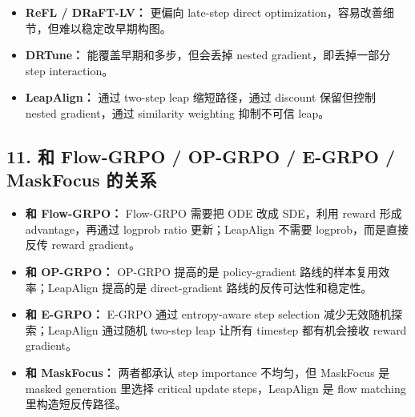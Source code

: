 \begin{itemize}[leftmargin=1.5em]
  \item \textbf{ReFL / DRaFT-LV：} 更偏向 late-step direct optimization，容易改善细节，但难以稳定改早期构图。
  \item \textbf{DRTune：} 能覆盖早期和多步，但会丢掉 nested gradient，即丢掉一部分 step interaction。
  \item \textbf{LeapAlign：} 通过 two-step leap 缩短路径，通过 discount 保留但控制 nested gradient，通过 similarity weighting 抑制不可信 leap。
\end{itemize}

\subsection{11. 和 Flow-GRPO / OP-GRPO / E-GRPO / MaskFocus 的关系}

\begin{center}
\end{center}

\begin{itemize}[leftmargin=1.5em]
  \item \textbf{和 Flow-GRPO：} Flow-GRPO 需要把 ODE 改成 SDE，利用 reward 形成 advantage，再通过 logprob ratio 更新；LeapAlign 不需要 logprob，而是直接反传 reward gradient。
  \item \textbf{和 OP-GRPO：} OP-GRPO 提高的是 policy-gradient 路线的样本复用效率；LeapAlign 提高的是 direct-gradient 路线的反传可达性和稳定性。
  \item \textbf{和 E-GRPO：} E-GRPO 通过 entropy-aware step selection 减少无效随机探索；LeapAlign 通过随机 two-step leap 让所有 timestep 都有机会接收 reward gradient。
  \item \textbf{和 MaskFocus：} 两者都承认 step importance 不均匀，但 MaskFocus 是 masked generation 里选择 critical update steps，LeapAlign 是 flow matching 里构造短反传路径。
\end{itemize}

